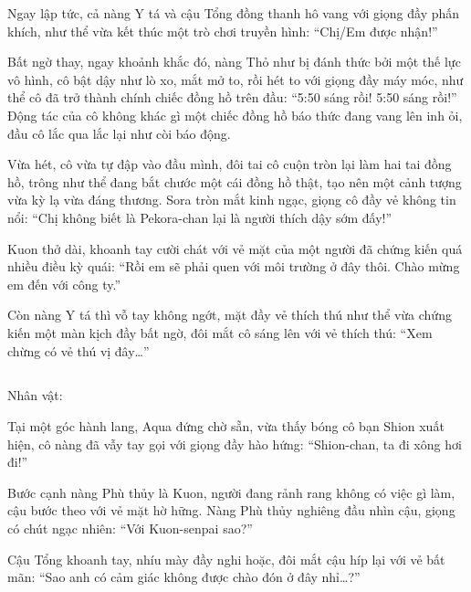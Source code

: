 \documentclass[../main.tex]{subfiles}
\begin{document}
Ngay lập tức, cả nàng Y tá và cậu Tổng đồng thanh hô vang với giọng đầy phấn khích, như thể vừa kết thúc một trò chơi truyền hình: ``Chị/Em được nhận!''

Bất ngờ thay, ngay khoảnh khắc đó, nàng Thỏ như bị đánh thức bởi một thế lực vô hình, cô bật dậy như lò xo, mắt mở to, rồi hét to với giọng đầy máy móc, như thể cô đã trở thành chính chiếc đồng hồ trên đầu: ``5:50 sáng rồi! 5:50 sáng rồi!'' Động tác của cô không khác gì một chiếc đồng hồ báo thức đang vang lên inh ỏi, đầu cô lắc qua lắc lại như còi báo động.


Vừa hét, cô vừa tự đập vào đầu mình, đôi tai cô cuộn tròn lại làm hai tai đồng hồ, trông như thể đang bắt chước một cái đồng hồ thật, tạo nên một cảnh tượng vừa kỳ lạ vừa đáng thương. Sora tròn mắt kinh ngạc, giọng cô đầy vẻ không tin nổi: ``Chị không biết là Pekora-chan lại là người thích dậy sớm đấy!''

Kuon thở dài, khoanh tay cười chát với vẻ mặt của một người đã chứng kiến quá nhiều điều kỳ quái: ``Rồi em sẽ phải quen với môi trường ở đây thôi. Chào mừng em đến với công ty.''

Còn nàng Y tá thì vỗ tay không ngớt, mặt đầy vẻ thích thú như thể vừa chứng kiến một màn kịch đầy bất ngờ, đôi mắt cô sáng lên với vẻ thích thú: ``Xem chừng có vẻ thú vị đây\dots''

\newpage

\subsection*{\label{ep-S13.III}}
\begin{center}
  {\caviar\fontsize{12pt}{12pt}\selectfont Nhân vật:   }
\end{center}

Tại một góc hành lang, Aqua đứng chờ sẵn, vừa thấy bóng cô bạn Shion xuất hiện, cô nàng đã vẫy tay gọi với giọng đầy hào hứng: ``Shion-chan, ta đi xông hơi đi!''

Bước cạnh nàng Phù thủy là Kuon, người đang rảnh rang không có việc gì làm, cậu bước theo với vẻ mặt hờ hững. Nàng Phù thủy nghiêng đầu nhìn cậu, giọng có chút ngạc nhiên: ``Với Kuon-senpai sao?''

Cậu Tổng khoanh tay, nhíu mày đầy nghi hoặc, đôi mắt cậu híp lại với vẻ bất mãn: ``Sao anh có cảm giác không được chào đón ở đây nhỉ\dots?''
\end{document}
